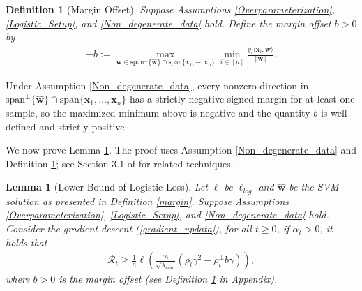 \documentclass[pdflatex,sn-basic]{sn-jnl}%
\theoremstyle{thmstyleone}%
\newtheorem{lemma}[theorem]{Lemma}
\newtheorem{definition}{Definition}%
\begin{document}
\begin{appendices}
\begin{definition}[Margin Offset]\label{Margin_Offset}
  Suppose Assumptions \ref{Overparameterization}, \ref{Logistic_Setup}, and \ref{Non_degenerate_data} hold. Define the margin offset $b > 0$ by
  \begin{equation*}
  \begin{aligned}
    -b := \max_{\mathbf{w} \in \text{span}^{\perp}\{\hat{\mathbf{w}}\} \cap \text{span} \{\mathbf{x}_1, \cdots, \mathbf{x}_n\}}
    \min_{i \in [n]} \frac{y_i \langle \mathbf{x}_i, \mathbf{w} \rangle}{\Vert \mathbf{w} \Vert}.
  \end{aligned}
  \end{equation*}
\end{definition}
Under Assumption \ref{Non_degenerate_data}, every nonzero direction in $\text{span}^{\perp}\{\hat{\mathbf{w}}\} \cap \text{span}\{\mathbf{x}_1,\ldots,\mathbf{x}_n\}$ has a strictly negative signed margin for at least one sample, so the maximized minimum above is negative and the quantity $b$ is well-defined and strictly positive.

We now prove Lemma \ref{risk_lowerbound_logit_reg}. The proof uses Assumption \ref{Non_degenerate_data} and Definition \ref{Margin_Offset}; see Section 3.1 of \cite{eos_logistic_regression} for related techniques.
\begin{lemma}[Lower Bound of Logistic Loss]\label{risk_lowerbound_logit_reg}
    Let $\ell$ be $\ell_{log}$ and $\hat{\mathbf{w}}$ be the SVM solution as presented in Definition \ref{margin}. 
  Suppose Assumptions \ref{Overparameterization}, \ref{Logistic_Setup}, and \ref{Non_degenerate_data} hold.
  Consider the gradient descent (\ref{gradient_updata}), 
  for all $t \ge 0$, if $\alpha_t > 0$, it holds that 
  \begin{equation*}
  \begin{aligned}
    \mathcal{R}_t \ge \frac{1}{n} \ell \left( 
      \frac{\alpha_t}{\sqrt{\lambda_{\min}}}
      \left(
        \rho_t \gamma^2  
      - \rho_t^{\perp} b \gamma
      \right)
    \right),
  \end{aligned}
  \end{equation*}
  where $b>0$ is the margin offset (see Definition \ref{Margin_Offset} in Appendix).
\end{lemma}


\end{appendices}
\end{document}
